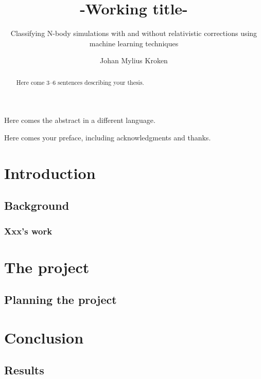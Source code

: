 \documentclass[UKenglish]{old_el_paso/uiomasterthesis}
\title{-Working title-}        %
\subtitle{Classifying N-body simulations with and without
relativistic corrections using machine learning
techniques}         %
\author{Johan Mylius Kroken}                      %
\begin{document}
\uiomasterfp[dept={Institute of Theoretical Astrophysics},  %
  program={Computational Science: Astrophysics},                        %
  supervisors={A David Fonseca Mota\and B Julian Adamek\and C Francisco Antonio Villaescusa Navarro},
  color=green,     %
  long]                                     %

\frontmatter{}
\begin{abstract}
  Here come 3--6 sentences describing your thesis.
\end{abstract}

\begin{xabstract}[Sammendrag]               %
  Here comes the abstract in a different language.
\end{xabstract}

\tableofcontents{}                          %
\listoffigures{}                            %
\listoftables{}                             %

\begin{preface}
  Here comes your preface, including acknowledgments and thanks.
\end{preface}

\mainmatter{}
\part{Introduction}                   %
\chapter{Background}                  %
\section{Xxx's work}                  %

\part{The project}                    %
\chapter{Planning the project}        %

\part{Conclusion}                     %
\chapter{Results}                     %

\backmatter{}
\end{document}
